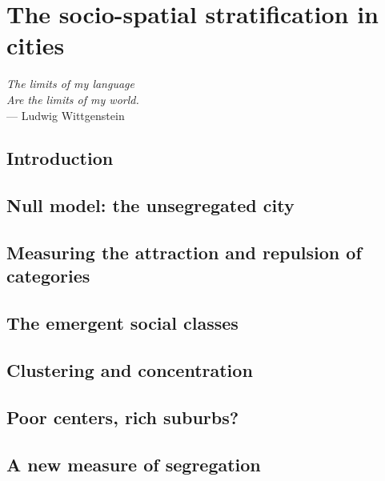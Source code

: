 %
\chapter{The socio-spatial stratification in cities}
\label{sec:concepts}


\begin{flushright}{\slshape    
The limits of my language\\
Are the limits of my world.} \\ \medskip
--- Ludwig Wittgenstein 
\end{flushright}

\section{Introduction}
\label{sec:introduction}

\section{Null model: the unsegregated city}
\label{sec:null_model_the_unsegregated_city}

\section{Measuring the attraction and repulsion of categories}
\label{sec:measuring_the_attraction_and_repulsion_of_categories}

\section{The emergent social classes}
\label{sec:the_emergent_social_classes}

\section{Clustering and concentration}
\label{sec:clustering_and_concentration}

\section{Poor centers, rich suburbs?}
\label{sec:poor_centers_rich_suburbs_}

\section{A new measure of segregation}
\label{sec:a_new_measure_of_segregation}
